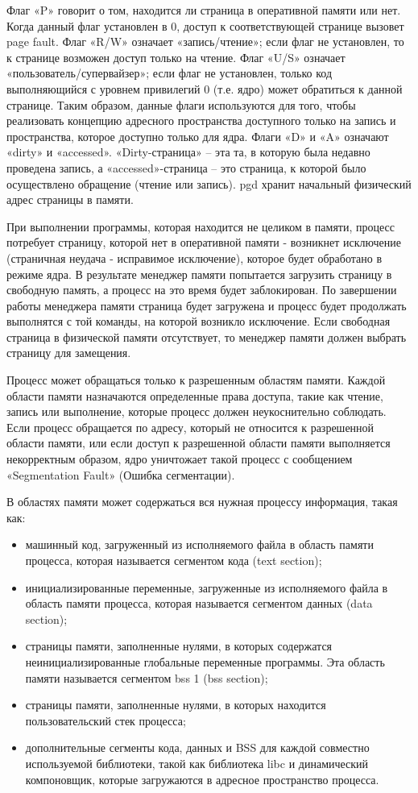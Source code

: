 Флаг «P» говорит о том, находится ли страница в оперативной памяти или нет.
Когда данный флаг установлен в 0, доступ к соответствующей странице вызовет page fault.
Флаг «R/W» означает «запись/чтение»; если флаг не установлен, то к странице возможен доступ только на чтение.
Флаг «U/S» означает «пользователь/супервайзер»; если флаг не установлен, только код выполняющийся 
с уровнем привилегий 0 (т.е. ядро) может обратиться к данной странице.
Таким образом, данные флаги используются для того, чтобы реализовать концепцию адресного 
пространства доступного только на запись и пространства, которое доступно только для ядра.
Флаги «D» и «A» означают «dirty» и «accessed». «Dirty-страница» – эта та, в которую была недавно проведена запись, 
а «accessed»-страница – это страница, к которой было осуществлено обращение (чтение или запись). 
pgd хранит начальный физический адрес страницы в памяти.

При выполнении программы, которая находится не целиком в памяти, процесс потребует страницу, 
которой нет в оперативной памяти - возникнет исключение (страничная неудача - исправимое исключение), 
которое будет обработано в режиме ядра. В результате менеджер памяти попытается загрузить страницу 
в свободную память, а процесс на это время будет заблокирован. По завершении работы менеджера памяти страница
будет загружена и процесс будет продолжать выполнятся с той команды, на которой возникло исключение. 
Если свободная страница в физической памяти отсутствует, то менеджер памяти должен выбрать страницу для замещения.

Процесс может обращаться только к разрешенным областям памяти. 
Каждой области памяти назначаются определенные права доступа, такие как чтение, запись 
или выполнение, которые процесс должен неукоснительно соблюдать. 
Если процесс обращается по адресу, который не относится к разрешенной области памяти, 
или если доступ к разрешенной области памяти выполняется некорректным образом, ядро уничтожает такой
процесс с сообщением «Segmentation Fault» (Ошибка сегментации).

В областях памяти может содержаться вся нужная процессу информация, такая как:

\begin{itemize}
	\item машинный код, загруженный из исполняемого файла в область памяти процесса, которая называется сегментом кода (text section);
	\item инициализированные переменные, загруженные из исполняемого файла в область памяти процесса, которая называется сегментом данных (data section);
	\item страницы памяти, заполненные нулями, в которых содержатся неинициализированные глобальные переменные программы. Эта область памяти называется сегментом bss 1 (bss section);
	\item страницы памяти, заполненные нулями, в которых находится пользовательский стек процесса;
	\item дополнительные сегменты кода, данных и BSS для каждой совместно используемой библиотеки, такой как библиотека libc и динамический компоновщик, которые загружаются в адресное пространство процесса.
\end{itemize}

